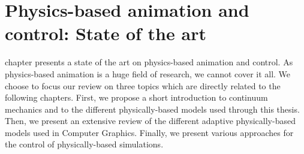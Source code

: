 \chapter{Physics-based animation and control: State of the art}
\label{chap:star}

 chapter presents a state of the art on physics-based animation and control.
As physics-based animation is a huge field of research, we cannot cover it all.
We choose to focus our review on three topics which are directly related to the following chapters.
First, we propose a short introduction to continuum mechanics and to the different physically-based models used through this thesis.
Then, we present an extensive review of the different adaptive physically-based models used in Computer Graphics.
Finally, we present various approaches for the control of physically-based simulations.


%
%

